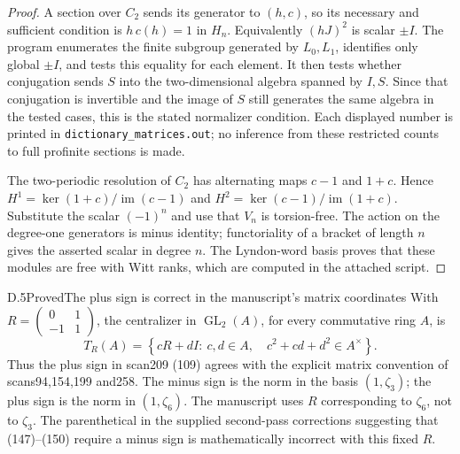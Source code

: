\begin{proof}
A section over $C_2$ sends its generator to $(h,c)$, so its necessary and sufficient condition is $h\,c(h)=1$ in $H_n$. Equivalently $(hJ)^2$ is scalar $\pm I$. The program enumerates the finite subgroup generated by $L_0,L_1$, identifies only global $\pm I$, and tests this equality for each element. It then tests whether conjugation sends $S$ into the two-dimensional algebra spanned by $I,S$. Since that conjugation is invertible and the image of $S$ still generates the same algebra in the tested cases, this is the stated normalizer condition. Each displayed number is printed in \texttt{dictionary\_matrices.out}; no inference from these restricted counts to full profinite sections is made.

The two-periodic resolution of $C_2$ has alternating maps $c-1$ and $1+c$. Hence $H^1=\ker(1+c)/\operatorname{im}(c-1)$ and $H^2=\ker(c-1)/\operatorname{im}(1+c)$. Substitute the scalar $(-1)^n$ and use that $V_n$ is torsion-free. The action on the degree-one generators is minus identity; functoriality of a bracket of length $n$ gives the asserted scalar in degree $n$. The Lyndon-word basis proves that these modules are free with Witt ranks, which are computed in the attached script.
\end{proof}

\begin{claim}{D.5}{Proved}{The plus sign is correct in the manuscript's matrix coordinates}
With $R=\left(\begin{smallmatrix}0&1\\-1&1\end{smallmatrix}\right)$, the centralizer in $\operatorname{GL}_2(A)$, for every commutative ring $A$, is
\[
 T_R(A)=\left\{cR+dI:\ c,d\in A,\quad c^2+cd+d^2\in A^\times\right\}.
\]
Thus the plus sign in scan209 (109) agrees with the explicit matrix convention of scans94,154,199 and258. The minus sign is the norm in the basis $(1,\zeta_3)$; the plus sign is the norm in $(1,\zeta_6)$. The manuscript uses $R$ corresponding to $\zeta_6$, not to $\zeta_3$. The parenthetical in the supplied second-pass corrections suggesting that (147)--(150) require a minus sign is mathematically incorrect with this fixed $R$.
\end{claim}

